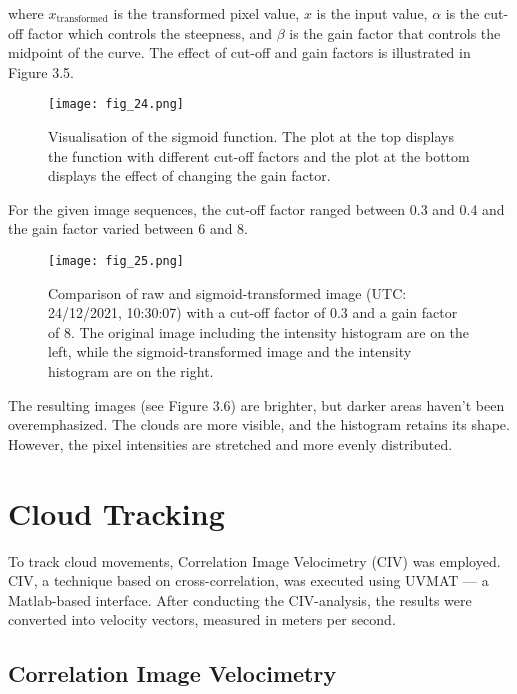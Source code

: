 where \( x_{\text{transformed}}\) is the transformed pixel value, \( x\) is the input value, \( \alpha\) is the cut-off factor which controls the steepness, and \( \beta\) is the gain factor that controls the midpoint of the curve. The effect of cut-off and gain factors is illustrated in Figure 3.5. 
\FloatBarrier
\begin{figure}[h!] 
    \centering
    \texttt{[image: fig\_24.png]}
    \caption{Visualisation of the sigmoid function. The plot at the top displays the function with different cut-off factors and the plot at the bottom displays the effect of changing the gain factor.}
\end{figure}
\FloatBarrier
For the given image sequences, the cut-off factor ranged between 0.3 and 0.4 and the gain factor varied between 6 and 8.
\FloatBarrier
\begin{figure}[h!] 
    \centering
    \texttt{[image: fig\_25.png]}
    \caption{Comparison of raw and sigmoid-transformed image (UTC: 24/12/2021, 10:30:07) with a cut-off factor of 0.3 and a gain factor of 8. The original image including the intensity histogram are on the left, while the sigmoid-transformed image and the intensity histogram are on the right. }
\end{figure}
\FloatBarrier
The resulting images (see Figure 3.6) are brighter, but darker areas haven't been overemphasized. The clouds are more visible, and the histogram retains its shape. However, the pixel intensities are stretched and more evenly distributed.

\section{Cloud Tracking}

To track cloud movements, Correlation Image Velocimetry (CIV) was employed. CIV, a technique based on cross-correlation, was executed using UVMAT — a Matlab-based interface\cite{SoftUVMAT}. After conducting the CIV-analysis, the results were converted into velocity vectors, measured in meters per second. 

\subsection{Correlation Image Velocimetry}

